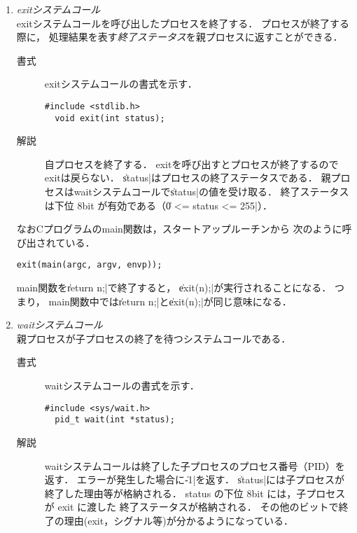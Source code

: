 \begin{enumerate}
\item \emph{exitシステムコール} \\
  exitシステムコールを呼び出したプロセスを終了する．
  プロセスが終了する際に，
  処理結果を表す\emph{終了ステータス}を親プロセスに返すことができる．

  \begin{description}
  \item[書式] exitシステムコールの書式を示す．
\begin{lstlisting}[numbers=none]
  #include <stdlib.h>
  void exit(int status);
\end{lstlisting}

  \item[解説] 自プロセスを終了する．
    exitを呼び出すとプロセスが終了するのでexitは戻らない．
    \|status|はプロセスの終了ステータスである．
    親プロセスはwaitシステムコールで\|status|の値を受け取る．
    終了ステータスは下位 8bit が有効である（\|0 <= status <= 255|）．
  \end{description}

  なおCプログラムのmain関数は，スタートアップルーチンから
  次のように呼び出されている．

  \centerline{\texttt{exit(main(argc, argv, envp));}}

  main関数を\|return n;|で終了すると，
  \|exit(n);|が実行されることになる．
  つまり，
  main関数中では\|return n;|と\|exit(n);|が同じ意味になる．

\item \emph{waitシステムコール} \\
  親プロセスが子プロセスの終了を待つシステムコールである．
  \begin{description}
  \item[書式] waitシステムコールの書式を示す．

\begin{lstlisting}[numbers=none]
  #include <sys/wait.h>
  pid_t wait(int *status);
\end{lstlisting}

  \item[解説] 
    waitシステムコールは終了した子プロセスのプロセス番号（PID）を返す．
    エラーが発生した場合に\|-1|を返す．
    \|status|には子プロセスが終了した理由等が格納される．
    status の下位 8bit には，子プロセスが exit に渡した
    終了ステータスが格納される．
    その他のビットで終了の理由(exit，シグナル等)が分かるようになっている．
  \end{description}
\end{enumerate}

